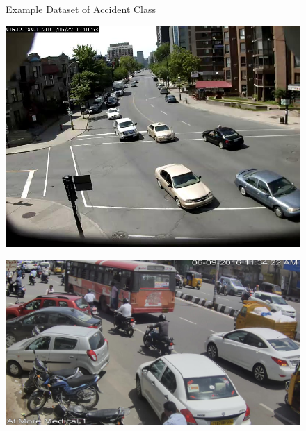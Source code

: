 \documentclass[ 12pt,a4paper,twocolumn,fleqn]{article}
\begin{document}
\begin{adjustwidth}{3.5em}{0pt}
\begin{figure}[H]
\begin{center}
  \caption{ Example Dataset of Accident Class}
\end{center}
\end{figure}
\vfill

\newpage
  \pagestyle{fancy}

\vspace*{\fill}
\begin{figure}[H]
\begin{center}
    \hspace*{0.4in}
    \includegraphics[scale=0.3]{media/noacc1.jpg}
        
    \hspace{0.1cm}
\end{center}
\end{figure}
\begin{figure}[H]
\begin{center}
    
    \hspace*{0.4in}
    \includegraphics[scale=0.15]{media/noacc2.jpg}
        

\end{center}
\end{figure}
\end{adjustwidth}
\end{document}
